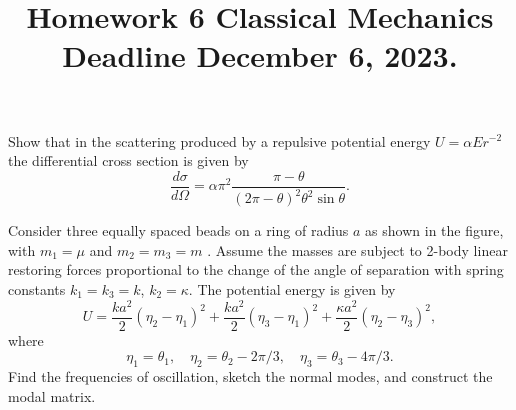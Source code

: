 \documentclass[12pt]{article}
\newenvironment{problem}[2][Problem]{\begin{trivlist}
\item[\hskip \labelsep {\bfseries #1}\hskip \labelsep {\bfseries #2.}]}{\end{trivlist}}
\begin{document}
 
 
\title{Homework 6 Classical Mechanics\\Deadline December 6, 2023.}
\date{}
 
\maketitle


\begin{problem}{1}
Show that in the scattering produced by a repulsive potential energy $U = \alpha E r ^{-2}$
the differential cross section is given by
\begin{equation}
\frac{d\sigma}{d\Omega}=\alpha\pi^2\frac{\pi-\theta}{(2\pi-\theta)^2\theta^2\sin\theta}.
\end{equation}
\end{problem}


\begin{problem}{2}
Consider three equally spaced beads on a ring of radius $a$ as shown in the figure, with $m_1=\mu$ and $m_2 = m_3 =  m$ . Assume the masses are subject to 2-body linear
restoring forces proportional to the change of the angle of separation with spring constants $k_1 = k_3 = k$, $k_2 = \kappa$. The potential
energy is given by
\begin{equation}
U=\frac{k a^2}{2}(\eta_2-\eta_1)^2+\frac{k a^2}{2}(\eta_3-\eta_1)^2+\frac{\kappa a^2}{2}(\eta_2-\eta_3)^2,
\end{equation}
where
\begin{equation}
\eta_1=\theta_1,\quad \eta_2=\theta_2-2\pi/3,\quad\eta_3=\theta_3-4\pi/3.
\end{equation}
Find the frequencies of oscillation, sketch the normal modes, and
construct the modal matrix.


\begin{center}
\end{center}

\end{problem}
\end{document}
